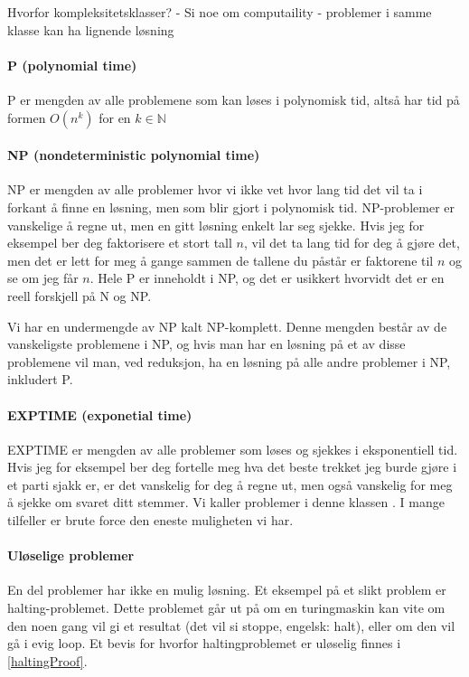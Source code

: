 Hvorfor kompleksitetsklasser?
- Si noe om computaility
- problemer i samme klasse kan ha lignende løsning



\paragraph{P (polynomial time)}
P er mengden av alle problemene som kan løses i polynomisk tid, altså har tid på formen $ O(n^k) $ for en $ k \in \mathbb{N} $

\paragraph{NP (nondeterministic polynomial time)}
NP er mengden av alle problemer hvor vi ikke vet hvor lang tid det vil ta i forkant å finne en løsning, men som blir gjort i polynomisk tid. NP-problemer er vanskelige å regne ut, men en gitt løsning enkelt lar seg sjekke. Hvis jeg for eksempel ber deg faktorisere et stort tall $ n $, vil det ta lang tid for deg å gjøre det, men det er lett for meg å gange sammen de tallene du påstår er faktorene til $ n $ og se om jeg får $ n $. Hele P er inneholdt i NP, og det er usikkert hvorvidt det er en reell forskjell på N og NP.

Vi har en undermengde av NP kalt NP-komplett. Denne mengden består av de vanskeligste problemene i NP, og hvis man har en løsning på et av disse problemene vil man, ved reduksjon, ha en løsning på alle andre problemer i NP, inkludert P.

\paragraph{EXPTIME (exponetial time)}
EXPTIME er mengden av alle problemer som løses og sjekkes i eksponentiell tid. Hvis jeg for eksempel ber deg fortelle meg hva det beste trekket jeg burde gjøre i et parti sjakk er, er det vanskelig for deg å regne ut, men også vanskelig for meg å sjekke om svaret ditt stemmer. Vi kaller problemer i denne klassen . I mange tilfeller er brute force den eneste muligheten vi har. 

\paragraph{Uløselige problemer} 
En del problemer har ikke en mulig løsning. Et eksempel på et slikt problem er halting-problemet. Dette problemet går ut på om en turingmaskin kan vite om den noen gang vil gi et resultat (det vil si stoppe, engelsk: halt), eller om den vil gå i evig loop. Et bevis for hvorfor haltingproblemet er uløselig finnes i \ref{haltingProof}. 

